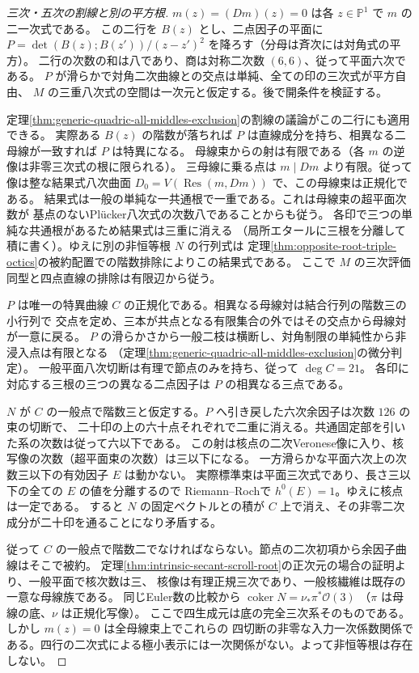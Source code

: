 \begin{proof}[三次・五次の割線と別の平方根]
$m(z)=(Dm)(z)=0$ は各 $z\in\mathbb P^1$ で $m$ の二一次式である。
この二行を $B(z)$ とし、二点因子の平面に
$P=\det(B(z);B(z'))/(z-z')^2$ を降ろす（分母は斉次には対角式の平方）。
二行の次数の和は八であり、商は対称二次数 $(6,6)$、従って平面六次である。
$P$ が滑らかで対角二次曲線との交点は単純、全ての印の三次式が平方自由、
$M$ の三重八次式の空間は一次元と仮定する。後で開条件を検証する。

定理\ref{thm:generic-quadric-all-middles-exclusion}の割線の議論がこの二行にも適用できる。
実際ある $B(z)$ の階数が落ちれば $P$ は直線成分を持ち、相異なる二母線が一致すれば $P$ は特異になる。
母線束からの射は有限である（各 $m$ の逆像は非零三次式の根に限られる）。
三母線に乗る点は $m\mid Dm$ より有限。従って像は整な結果式八次曲面
$D_0=V(\operatorname{Res}(m,Dm))$ で、この母線束は正規化である。
結果式は一般の単純な一共通根で一重である。これは母線束の超平面次数が
基点のないPlücker八次式の次数八であることからも従う。
各印で三つの単純な共通根があるため結果式は三重に消える
（局所エタールに三根を分離して積に書く）。ゆえに別の非恒等根 $N$ の行列式は
定理\ref{thm:opposite-root-triple-octics}の被約配置での階数排除によりこの結果式である。
ここで $M$ の三次評価同型と四点直線の排除は有限辺から従う。

$P$ は唯一の特異曲線 $C$ の正規化である。相異なる母線対は結合行列の階数三の小行列で
交点を定め、三本が共点となる有限集合の外ではその交点から母線対が一意に戻る。
$P$ の滑らかさから一般二枝は横断し、対角制限の単純性から非浸入点は有限となる
（定理\ref{thm:generic-quadric-all-middles-exclusion}の微分判定）。
一般平面八次切断は有理で節点のみを持ち、従って $\deg C=21$。
各印に対応する三根の三つの異なる二点因子は $P$ の相異なる三点である。

$N$ が $C$ の一般点で階数三と仮定する。$P$ へ引き戻した六次余因子は次数 $126$ の束の切断で、
二十印の上の六十点それぞれで二重に消える。共通固定部を引いた系の次数は従って六以下である。
この射は核点の二次Veronese像に入り、核写像の次数（超平面束の次数）は三以下になる。
一方滑らかな平面六次上の次数三以下の有効因子 $E$ は動かない。
実際標準束は平面三次式であり、長さ三以下の全ての $E$ の値を分離するので
Riemann--Rochで $h^0(E)=1$。ゆえに核点は一定である。
すると $N$ の固定ベクトルとの積が $C$ 上で消え、その非零二次成分が二十印を通ることになり矛盾する。

従って $C$ の一般点で階数二でなければならない。節点の二次初項から余因子曲線はそこで被約。
定理\ref{thm:intrinsic-secant-scroll-root}の正次元の場合の証明より、一般平面で核次数は三、
核像は有理正規三次であり、一般核繊維は既存の一意な母線族である。
同じEuler数の比較から $\operatorname{coker}N=\nu_*\pi^*\mathcal O(3)$
（$\pi$ は母線の底、$\nu$ は正規化写像）。
ここで四生成元は底の完全三次系そのものである。しかし $m(z)=0$ は全母線束上でこれらの
四切断の非零な入力一次係数関係である。四行の二次式による極小表示には一次関係がない。よって非恒等根は存在しない。
\end{proof}

